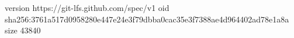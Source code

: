 version https://git-lfs.github.com/spec/v1
oid sha256:3761a517d0958280e447e24e3f79dbba0cac35e3f7388ae4d964402ad78e1a8a
size 43840
